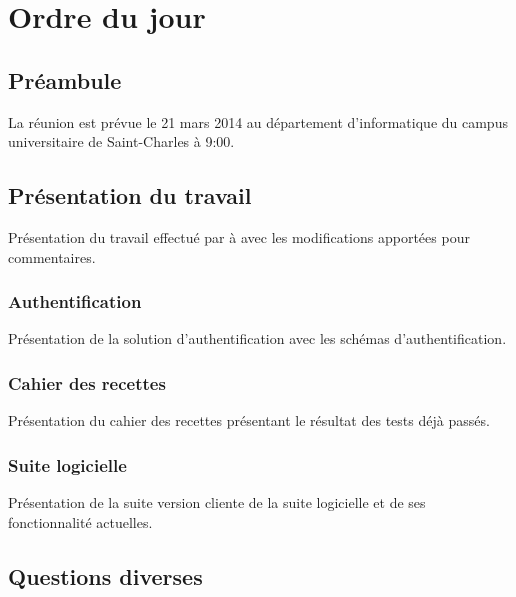 \documentclass[11pt,fleqn]{report}
\begin{document}
\ZMakeCover


\chapter*{Ordre du jour}
\setcounter{chapter}{1}

\section{Préambule}
La réunion est prévue le 21 mars 2014 au département d'informatique du campus universitaire de Saint-Charles à 9:00.

\section{Présentation du travail}
Présentation du travail effectué par \amo à \mo avec les modifications apportées pour commentaires.

\subsection{Authentification}
Présentation de la solution d'authentification avec les schémas d'authentification.

\subsection{Cahier des recettes}
Présentation du cahier des recettes présentant le résultat des tests déjà passés.

\subsection{Suite logicielle}
Présentation de la suite version cliente de la suite logicielle et de ses fonctionnalité actuelles.

\section{Questions diverses}
\end{document}
